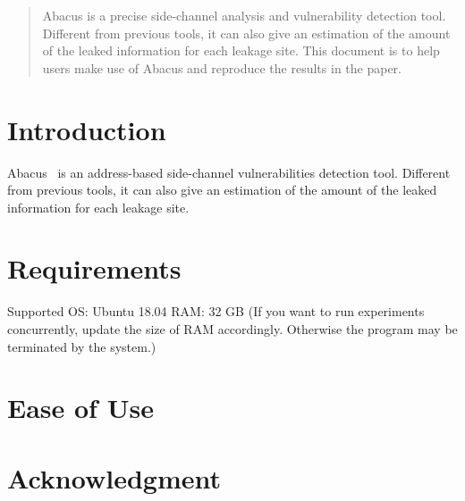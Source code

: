 \documentclass[10pt,conference]{IEEEtran}
\begin{document}
\title{}
\author{
}


\maketitle

\begin{abstract}
Abacus is a precise side-channel analysis and vulnerability detection
tool. Different from previous tools, it can also give an estimation
of the amount of the leaked information for each leakage site.
This document is to help users make use of Abacus and reproduce the
results in the paper.
\end{abstract}


\section{Introduction}
Abacus~\cite{bao2021abacus} is an address-based side-channel vulnerabilities detection tool. Different from previous tools, it can also give an estimation of the amount of the leaked information for each leakage site.

\section{Requirements}


Supported OS: Ubuntu 18.04
RAM: 32 GB (If you want to run experiments concurrently, update the size of RAM
     accordingly. Otherwise the program may be terminated by the system.)  


\section{Ease of Use}


\section*{Acknowledgment}





\end{document}
